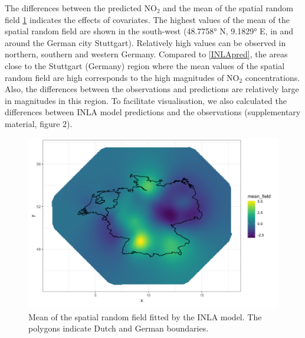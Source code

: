 \documentclass{article}
\begin{document}
The differences between the predicted NO$_2$ and the mean of the spatial random field \cref{randomfield} indicates the effects of covariates. The highest values of the mean of the spatial random field are shown in the south-west (48.7758° N, 9.1829° E, in and around the German city Stuttgart). Relatively high values can be observed in northern, southern and western Germany. Compared to \cref{INLApred}, the areas close to the Stuttgart (Germany) region where the mean values of the spatial random field are high corresponds to the high magnitudes of NO$_2$ concentrations. Also, the differences between the observations and predictions are relatively large in magnitudes in this region. To facilitate visualisation, we also calculated the differences between INLA model predictions and the observations  (supplementary material, figure 2).  

 
  

\begin{figure}
\centering
\includegraphics[scale = 0.5]{fig/mean_randomfield.png}
\caption{Mean of the spatial random field fitted by the INLA model. The polygons indicate Dutch and German boundaries.}
\label{randomfield}
\end{figure}
\end{document}

